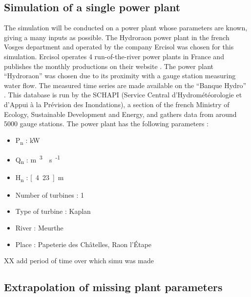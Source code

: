 \subsection{Simulation of a single power plant}

The simulation will be conducted on a power plant whose parameters are known, giving a many inputs as possible. The Hydroraon power plant in the french Vosges department and operated by the company Ercisol was chosen for this simulation. Ercisol operates 4 run-of-the-river power plants in France and publishes the monthly productions on their website \cite{ercisol}. The power plant ``Hydroraon'' was chosen due to its proximity with a gauge station measuring water flow. The measured time series are made available on the ``Banque Hydro'' \cite{eaufrance}. This database is run by the SCHAPI (Service Central d'Hydrométéorologie et d'Appui à la Prévision des Inondations), a section of the french Ministry of Ecology, Sustainable Development and Energy, and gathers data from around 5000 gauge stations. \newline
The power plant has the following parameters :
\begin{itemize}
 \item P\textsubscript{n} \tabto{4cm}: \unit[400]{kW}
 \item Q\textsubscript{n} \tabto{4cm}: \unit[12]{m\textsuperscript{3}\textperiodcentered s\textsuperscript{-1}}
 \item H\textsubscript{n} \tabto{4cm}: \unit[4.23]{m}
 \item Number of turbines \tabto{4cm}: 1
 \item Type of turbine \tabto{4cm}: Kaplan
 \item River \tabto{4cm}: Meurthe
 \item Place \tabto{4cm}: Papeterie des Châtelles, Raon l'Étape
\end{itemize}

XX add period of time over which simu was made

\subsection{Extrapolation of missing plant parameters}

